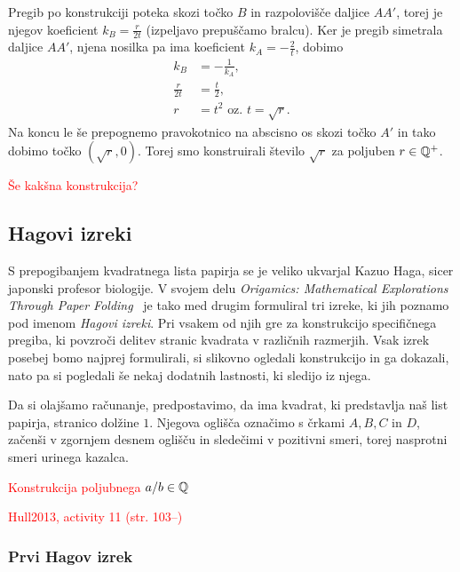 Pregib po konstrukciji poteka skozi točko $B$ in razpolovišče daljice $AA'$, torej je njegov koeficient $k_B = \frac{r}{2t}$ (izpeljavo prepuščamo bralcu). Ker je pregib simetrala daljice $AA'$, njena nosilka pa ima koeficient $k_A = - \frac{2}{t}$, dobimo
\begin{align*}
    k_B &= - \frac{1}{k_A},\\
    \frac{r}{2t} &= \frac{t}{2},\\
    r &= t^2 \text{ oz. } t = \sqrt{r}.
\end{align*}
Na koncu le še prepognemo pravokotnico na abscisno os skozi točko $A'$ in tako dobimo točko $(\sqrt{r}, 0)$. Torej smo konstruirali število $\sqrt{r}$ za poljuben $r \in \mathbb Q^{+}$.

\textcolor{red}{Še kakšna konstrukcija?}

\subsection{Hagovi izreki}

S prepogibanjem kvadratnega lista papirja se je veliko ukvarjal Kazuo Haga, sicer japonski profesor biologije. V svojem delu \emph{Origamics: Mathematical Explorations Through Paper Folding}~\cite{haga2008} je tako med drugim formuliral tri izreke, ki jih poznamo pod imenom \emph{Hagovi izreki}. Pri vsakem od njih gre za konstrukcijo specifičnega pregiba, ki povzroči delitev stranic kvadrata v različnih razmerjih. Vsak izrek posebej bomo najprej formulirali, si slikovno ogledali konstrukcijo in ga dokazali, nato pa si pogledali še nekaj dodatnih lastnosti, ki sledijo iz njega.

Da si olajšamo računanje, predpostavimo, da ima kvadrat, ki predstavlja naš list papirja, stranico dolžine $1$. Njegova oglišča označimo s črkami $A, B, C$ in $D$, začenši v zgornjem desnem oglišču in sledečimi v pozitivni smeri, torej nasprotni smeri urinega kazalca.

\textcolor{red}{Konstrukcija poljubnega $a/b \in \mathbb Q$~\cite[str.\ 20--21]{lang2013}}

\textcolor{red}{Hull2013, activity 11 (str. 103--)}

\subsubsection{Prvi Hagov izrek}


